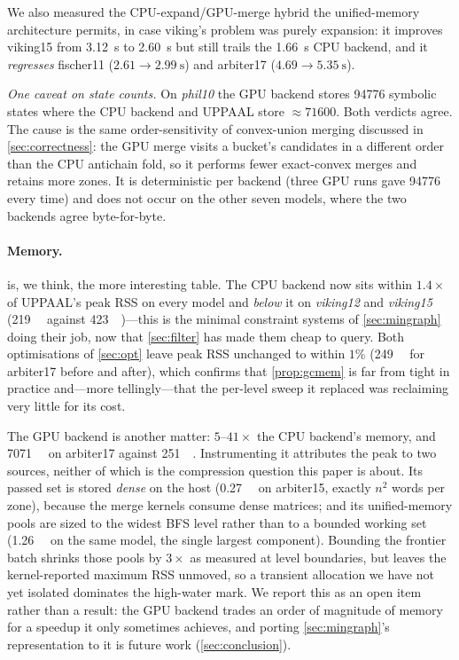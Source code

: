 We also measured the CPU-expand/GPU-merge hybrid the unified-memory architecture
permits, in case viking's problem was purely expansion: it improves viking15 from
\SI{3.12}{\second} to \SI{2.60}{\second} but still trails the \SI{1.66}{\second}
CPU backend, and it \emph{regresses} fischer11
($2.61 \to \SI{2.99}{\second}$) and arbiter17 ($4.69 \to \SI{5.35}{\second}$).

\emph{One caveat on state counts.}  On \emph{phil10} the GPU backend stores
\num{94776} symbolic states where the CPU backend and UPPAAL store
${\approx}\num{71600}$.  Both verdicts agree.  The cause is the same
order-sensitivity of convex-union merging discussed in \cref{sec:correctness}:
the GPU merge visits a bucket's candidates in a different order than the CPU
antichain fold, so it performs fewer exact-convex merges and retains more zones.
It is deterministic per backend (three GPU runs gave \num{94776} every time) and
does not occur on the other seven models, where the two backends agree
byte-for-byte.

\paragraph{Memory.}   is, we think, the more interesting table.
The CPU backend now sits within $1.4\times$ of UPPAAL's peak RSS on every model
and \emph{below} it on \emph{viking12} and \emph{viking15}
(\SI{219}{\mebi\byte} against \SI{423}{\mebi\byte})---this is the minimal
constraint systems of \cref{sec:mingraph} doing their job, now that
\cref{sec:filter} has made them cheap to query.  Both optimisations of
\cref{sec:opt} leave peak RSS unchanged to within $1\%$
(\SI{249}{\mebi\byte} for arbiter17 before and after), which confirms that
\cref{prop:gcmem} is far from tight in practice and---more tellingly---that the
per-level sweep it replaced was reclaiming very little for its cost.

The GPU backend is another matter: $5$--$41\times$ the CPU backend's memory, and
\SI{7071}{\mebi\byte} on arbiter17 against \SI{251}{\mebi\byte}.  Instrumenting
it attributes the peak to two sources, neither of which is the compression
question this paper is about.  Its passed set is stored \emph{dense} on the host
(\SI{0.27}{\giga\byte} on arbiter15, exactly $n^2$ words per zone), because the
merge kernels consume dense matrices; and its unified-memory pools are sized to
the widest BFS level rather than to a bounded working set
(\SI{1.26}{\giga\byte} on the same model, the single largest component).
Bounding the frontier batch shrinks those pools by $3\times$ as measured at level
boundaries, but leaves the kernel-reported maximum RSS unmoved, so a transient
allocation we have not yet isolated dominates the high-water mark.  We report
this as an open item rather than a result: the GPU backend trades an order of
magnitude of memory for a speedup it only sometimes achieves, and porting
\cref{sec:mingraph}'s representation to it is future work
(\cref{sec:conclusion}).

